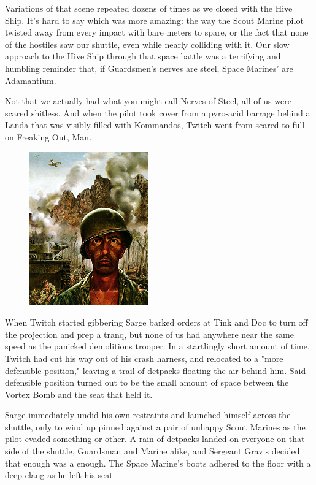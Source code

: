 Variations of that scene repeated dozens of times as we closed with the Hive Ship. 
It's hard to say which was more amazing: 
the way the Scout Marine pilot twisted away from every impact with bare meters to spare, or the fact that none of the hostiles saw our shuttle, even while nearly colliding with it. 
Our slow approach to the Hive Ship through that space battle was a terrifying and humbling reminder that, if Guardsmen's nerves are steel, Space Marines' are Adamantium.

Not that we actually had what you might call Nerves of Steel, all of us were scared shitless. 
And when the pilot took cover from a pyro-acid barrage behind a Landa that was visibly filled with Kommandos, Twitch went from scared to full on Freaking Out, Man.

\begin{figure}
	\begin{center}
		\includegraphics[width=\figwidth]{pics/12/30.png}
	\end{center}
\end{figure}
When Twitch started gibbering Sarge barked orders at Tink and Doc to turn off the projection and prep a tranq, but none of us had anywhere near the same speed as the panicked demolitions trooper. 
In a startlingly short amount of time, Twitch had cut his way out of his crash harness, and relocated to a "more defensible position," leaving a trail of detpacks floating the air behind him. 
Said defensible position turned out to be the small amount of space between the Vortex Bomb and the seat that held it.

Sarge immediately undid his own restraints and launched himself across the shuttle, only to wind up pinned against a pair of unhappy Scout Marines as the pilot evaded something or other. 
A rain of detpacks landed on everyone on that side of the shuttle, Guardsman and Marine alike, and Sergeant Gravis decided that enough was a enough. 
The Space Marine's boots adhered to the floor with a deep clang as he left his seat. 


